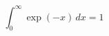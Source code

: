 \documentclass[preview]{standalone}
\begin{document}
$$\int_0^\infty \exp(-x)\,dx=1$$
\end{document}
